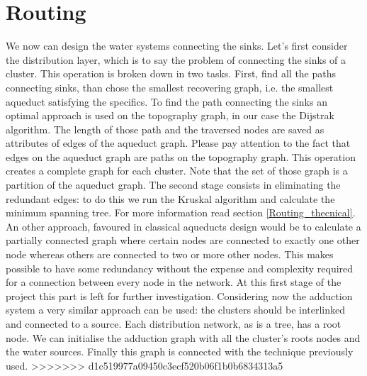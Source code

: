 \section {Routing}
We now can design the water systems connecting the sinks. Let’s first consider the distribution layer, which is to say the problem of connecting the sinks of a cluster. This operation is broken down in two tasks. First, find all the paths connecting sinks, than chose the smallest recovering graph, i.e. the smallest aqueduct satisfying the specifics. \hfill 
To find the path connecting the sinks an optimal approach is used on the topography graph, in our case the Dijstrak algorithm. The length of those path and the traversed nodes are saved as attributes of edges of the aqueduct graph. Please pay attention to the fact that edges on the aqueduct graph are paths on the topography graph. This operation creates a complete graph for each cluster. Note that the set of those graph is a partition of the aqueduct graph. \hfill 
The second stage consists in eliminating the redundant edges: to do this we run the Kruskal algorithm and calculate the minimum spanning tree. For more information read section \ref {Routing_thecnical}. An other approach, favoured in classical aqueducts design would be to calculate a partially connected graph where certain nodes are connected to exactly one other node whereas others are connected to two or more other nodes. This makes possible to have some redundancy without the expense and complexity required for a connection between every node in the network. At this first stage of the project this part is left for further investigation.
Considering now the adduction system a very similar approach can be used: the clusters should be interlinked and connected to a source. Each distribution network, as is a tree, has a root node. We can initialise the adduction graph with all the cluster's roots nodes and the water sources. Finally this graph is connected with the technique previously used.
>>>>>>> d1c519977a09450c3ecf520b06f1b0b6834313a5

